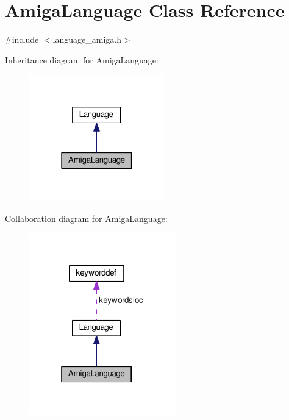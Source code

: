 \hypertarget{classAmigaLanguage}{}\section{Amiga\+Language Class Reference}
\label{classAmigaLanguage}


{\ttfamily \#include $<$language\+\_\+amiga.\+h$>$}



Inheritance diagram for Amiga\+Language\+:\nopagebreak
\begin{figure}[H]
\begin{center}
\leavevmode
\includegraphics[width=166pt]{classAmigaLanguage__inherit__graph}
\end{center}
\end{figure}


Collaboration diagram for Amiga\+Language\+:\nopagebreak
\begin{figure}[H]
\begin{center}
\leavevmode
\includegraphics[width=181pt]{classAmigaLanguage__coll__graph}
\end{center}
\end{figure}
